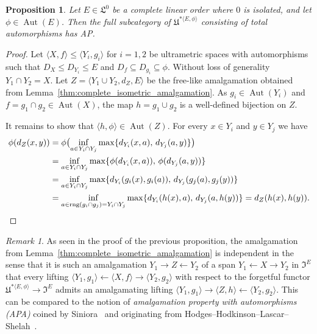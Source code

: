 \documentclass[10pt,a4paper]{article}
\newtheorem{prop}[tw]{Proposition}
\theoremstyle{definition}
\theoremstyle{remark}
\newtheorem{uwgi}[tw]{Remark}
\newcommand \set [1]{\{#1\}}
\newcommand \seq [1]{\langle #1 \rangle}
\newcommand \from {\leftarrow}
\newcommand \rng {\operatorname{rng}}
\newcommand \Lin {\mathfrak{L}}
\newcommand \Ult {\mathfrak{U}}
\newcommand \UltIso {\mathfrak{I}}
\newcommand \Aut {\operatorname{Aut}}
\let \aut \Aut
\begin{document}
\begin{prop} \label{thm:iso_auto_amalgamation}
    Let $E \in \Lin^0$ be a complete linear order where $0$ is isolated, and let $\phi \in \aut(E)$.
    Then the full subcategory of $\Ult^{*\seq{E, \phi}}$ consisting of total automorphisms has AP.
\end{prop}
\begin{proof}
    Let $\seq{X, f} \leq \seq{Y_i, g_i}$ for $i = 1, 2$ be ultrametric spaces with automorphisms such that $D_X \leq D_{Y_i} \leq E$ and $D_f \subseteq D_{g_i} \subseteq \phi$.
    Without loss of generality $Y_1 \cap Y_2 = X$.
    Let $Z = \seq{Y_1 \cup Y_2, d_Z, E}$ be the free-like amalgamation obtained from Lemma~\ref{thm:complete_isometric_amalgamation}.
    As $g_i \in \aut(Y_i)$ and $f = g_1 \cap g_2 \in \aut(X)$, the map $h = g_1 \cup g_2$ is a well-defined bijection on $Z$.

    It remains to show that $\seq{h, \phi} \in \aut(Z)$.
    For every $x \in Y_i$ and $y \in Y_j$ we have
    \begin{align*}
        \phi(d_Z(x, y)) &= \phi\bigl(\inf_{a \in Y_i \cap Y_j} \max\set{d_{Y_i}(x, a),\, d_{Y_j}(a, y)}\bigr) \\
        &= \inf_{a \in Y_i \cap Y_j} \max\set{\phi(d_{Y_i}(x, a)),\, \phi(d_{Y_j}(a, y))} \\
        &= \inf_{a \in Y_i \cap Y_j} \max\set{d_{Y_i}(g_i(x), g_i(a)),\, d_{Y_j}(g_j(a), g_j(y))} \\
        &= \inf_{a \in \rng(g_i \cap g_j) = Y_i \cap Y_j} \max\set{d_{Y_i}(h(x), a),\, d_{Y_j}(a, h(y))} 
        = d_Z(h(x), h(y)).
        \qedhere
    \end{align*}
\end{proof}

\begin{uwgi} \label{rmk:independent_amalgamation}
    As seen in the proof of the previous proposition, the amalgamation from Lemma~\ref{thm:complete_isometric_amalgamation} is independent in the sense that it is such an amalgamation $Y_1 \to Z \from Y_2$ of a span $Y_1 \from X \to Y_2$ in $\UltIso^E$ that every lifting $\seq{Y_1, g_1} \from \seq{X, f} \to \seq {Y_2, g_2}$ with respect to the forgetful functor $\Ult^{*\seq{E, \phi}} \to \UltIso^E$ admits an amalgamating lifting $\seq{Y_1, g_1} \to \seq{Z, h} \from \seq{Y_2, g_2}$.
    This can be compared to the notion of \emph{amalgamation property with automorphisms (APA)} coined by Siniora~\cite{Siniora} and originating from Hodges–Hodkinson–Lascar–Shelah~\cite{HHLS}.
\end{uwgi}
\end{document}
